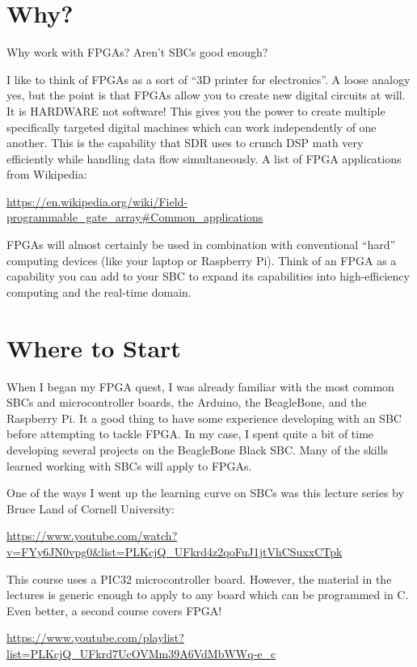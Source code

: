 \section{Why?}

Why work with FPGAs?  Aren't SBCs good enough?

I like to think of FPGAs as a sort of ``3D printer for electronics''.  A loose analogy yes, but the point is that FPGAs allow you to create new digital circuits at will.  It is HARDWARE not software!  This gives you the power to create multiple specifically targeted digital machines which can work independently of one another.  This is the capability that SDR uses to crunch DSP math very efficiently while handling data flow simultaneously.  A list of FPGA applications from Wikipedia:

\url{https://en.wikipedia.org/wiki/Field-programmable_gate_array#Common_applications}

FPGAs will almost certainly be used in combination with conventional ``hard'' computing devices (like your laptop or Raspberry Pi).  Think of an FPGA as a capability you can add to your SBC to expand its capabilities into high-efficiency computing and the real-time domain.

\section{Where to Start}

When I began my FPGA quest, I was already familiar with the most common SBCs and microcontroller boards, the Arduino, the BeagleBone, and the Raspberry Pi.
It a good thing to have some experience developing with an SBC before attempting to tackle FPGA.  In my case, I spent quite a bit of time developing several projects on the BeagleBone Black SBC.  Many of the skills learned working with SBCs will apply to FPGAs.

One of the ways I went up the learning curve on SBCs was this lecture series by Bruce Land of Cornell University:

\url{https://www.youtube.com/watch?v=FYy6JN0vpg0&list=PLKcjQ_UFkrd4z2qoFuJ1jtVhCSuxxCTpk}

This course uses a PIC32 microcontroller board.  However, the material in the lectures is generic enough to apply to any board which can be programmed in C.
Even better, a second course covers FPGA!

\url{https://www.youtube.com/playlist?list=PLKcjQ_UFkrd7UcOVMm39A6VdMbWWq-e_c}

